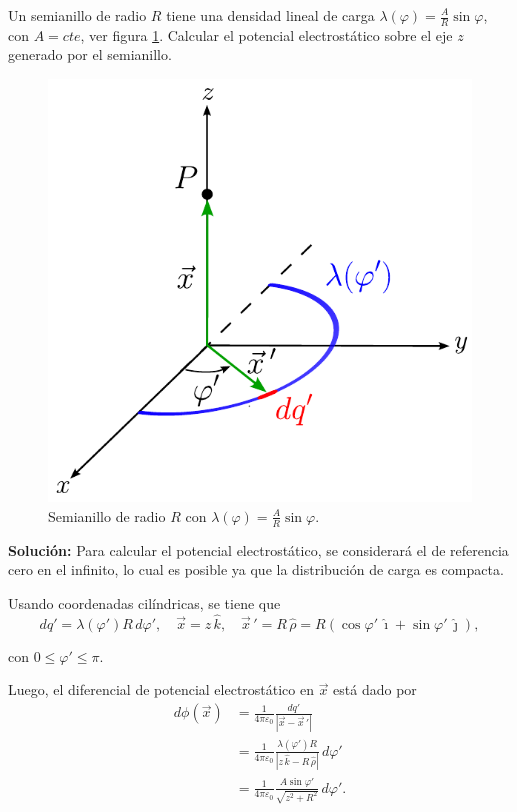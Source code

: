 \begin{ejemplo}
 Un semianillo de radio $R$ tiene una densidad lineal de carga $\lambda(\varphi) =  \frac{A}{R} \sin \varphi$, con $A = cte$, ver figura \ref{fig:Ej-Potencial-1}. Calcular el potencial electrostático sobre el eje $z$ generado por el semianillo.

\begin{figure}[H]
    \centering
    \includegraphics[scale = 0.6]{Figuras/Ej-Potencia-1.pdf}
    \caption{Semianillo de radio $R$ con $\lambda(\varphi) = \frac{A}{R} \sin \varphi$.}
    \label{fig:Ej-Potencial-1}
\end{figure}

\textbf{Solución:} Para calcular el potencial electrostático, se considerará el de referencia cero en el infinito, lo cual es posible ya que la distribución de carga es compacta.

Usando coordenadas cilíndricas, se tiene que
$$dq' = \lambda(\varphi') R \,d\varphi', \quad \vec{x} = z \,\hat{k}, \quad \Vec{x}\,' = R\,\hat{\rho} = R(\cos \varphi'\,\hat{\imath} + \sin \varphi'\,\hat{\jmath}),$$

con $0\leq \varphi' \leq \pi$.

Luego, el diferencial de potencial electrostático en $\vec{x}$ está dado por
\begin{align*}
    d\phi(\Vec{x}) &= \frac{1}{4\pi\varepsilon_0} \frac{dq'}{|\vec{x} - \Vec{x}\,'|} \\
    &= \frac{1}{4\pi\varepsilon_0} \frac{\lambda(\varphi') R}{|z\,\hat{k} - R\,\hat{\rho}|} \,d\varphi' \\
    &= \frac{1}{4\pi\varepsilon_0} \frac{A\sin\varphi'}{\sqrt{z^2 + R^2}} \,d\varphi'.
\end{align*}


\end{ejemplo}
